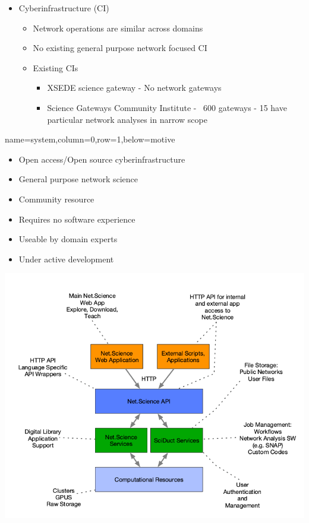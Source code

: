 \documentclass[landscape,paperwidth=70in,paperheight=46in,fontscale=0.225]{baposter} %
\begin{document}
\begin{poster}
{\begin{itemize}[leftmargin=*,noitemsep,topsep=0pt]
\item Cyberinfrastructure (CI)
	\begin{itemize}
	\item Network operations are similar across domains
	\item No existing general purpose network focused CI
	\item Existing CIs
	\begin{itemize}
	    \item XSEDE science gateway - No network gateways
	    \item Science Gateways Community Institute - ~600 gateways - 15 have
	    particular network analyses in narrow scope
	\end{itemize}
	\end{itemize}
\end{itemize}

}
          {name=system,column=0,row=1,below=motive}{

\begin{minipage}{.5\textwidth}
\begin{itemize}[leftmargin=*,noitemsep,topsep=0pt]
\item Open access/Open source cyberinfrastructure
\item General purpose network science
\item Community resource
\item Requires no software experience
\item Useable by domain experts
\item Under active development
\end{itemize}
\end{minipage}
\hfill
\begin{minipage}{.5\textwidth}
\begin{center}
\includegraphics[scale=0.22]{figures/sys_descr.png}
\end{center}
\end{minipage}
}


\end{poster}
\end{document}

